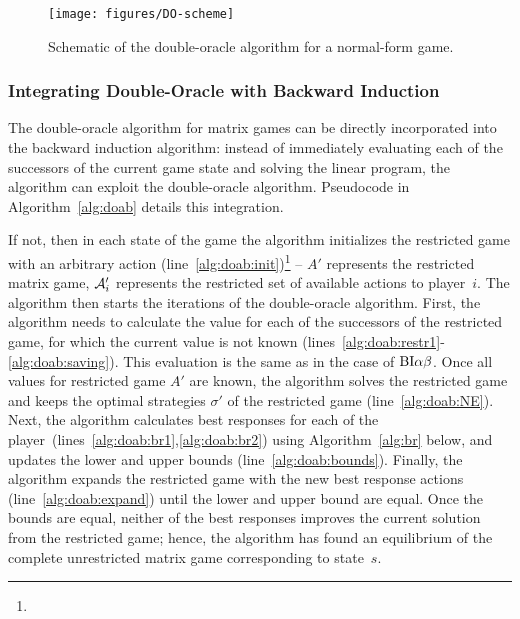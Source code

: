\begin{figure}[t!]
\centering
\texttt{[image: figures/DO-scheme]}
\caption{Schematic of the double-oracle algorithm for a normal-form game.}\label{fig:do-scheme}
\end{figure}

\subsubsection{Integrating Double-Oracle with Backward Induction}

The double-oracle algorithm for matrix games can be directly incorporated into the backward induction algorithm: instead of immediately evaluating each of the successors of the current game state and solving the linear program, the algorithm can exploit the double-oracle algorithm. Pseudocode in Algorithm~\ref{alg:doab} details this integration.

If not, then in each state of the game the algorithm initializes the restricted game with an arbitrary action (line~\ref{alg:doab:init})\footnote{} -- $A'$ represents the restricted matrix game, $\mathcal{A}'_i$ represents the restricted set of available actions to player~$i$.
The algorithm then starts the iterations of the double-oracle algorithm.
First, the algorithm needs to calculate the value for each of the successors of the restricted game, for which the current value is not known (lines~\ref{alg:doab:restr1}-\ref{alg:doab:saving}). This evaluation is the same as in the case of $\textrm{BI}\alpha\beta$. %
Once all values for restricted game $A'$ are known, the algorithm solves the restricted game and keeps the optimal strategies $\sigma'$ of the restricted game (line~\ref{alg:doab:NE}).
Next, the algorithm calculates best responses for each of the player~(lines~\ref{alg:doab:br1},\ref{alg:doab:br2}) using Algorithm~\ref{alg:br} below, and updates the lower and upper bounds (line~\ref{alg:doab:bounds}). Finally, the algorithm expands the restricted game with the new best response actions (line~\ref{alg:doab:expand}) until the lower and upper bound are equal.
Once the bounds are equal, neither of the best responses improves the current solution from the restricted game; hence, the algorithm has found an equilibrium of the complete unrestricted matrix game corresponding to state~$s$.


